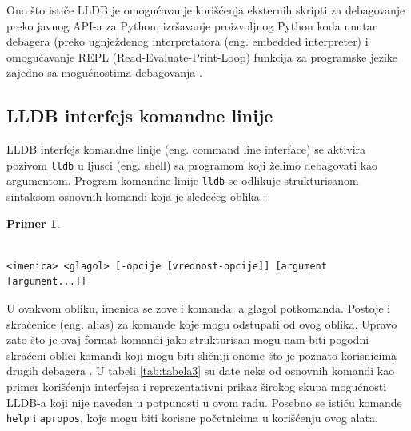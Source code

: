 \documentclass[a4paper]{article}
\newtheorem{primer}{Primer}[section]
\begin{document}
Ono što ističe LLDB je omogućavanje korišćenja eksternih skripti za debagovanje
preko javnog API-a za Python, izršavanje proizvoljnog Python koda unutar
debagera \cite{lldb_python} (preko ugnježdenog interpretatora (eng. embedded
interpreter) i omogućavanje REPL (Read-Evaluate-Print-Loop) funkcija za
programske jezike zajedno sa mogućnostima debagovanja \cite{swift_lldb_repl}.

\subsection{LLDB interfejs komandne linije}
LLDB interfejs komandne linije (eng. command line interface) se aktivira pozivom
\verb|lldb| u ljusci (eng. shell) sa programom koji želimo debagovati kao
argumentom. Program komandne linije \verb|lldb| se odlikuje strukturisanom sintaksom
osnovnih komandi koja je sledećeg oblika \cite{lldb_tutorial}:
\begin{primer}
  \begin{footnotesize}
\begin{verbatim}

<imenica> <glagol> [-opcije [vrednost-opcije]] [argument [argument...]]
\end{verbatim}
  \end{footnotesize}
\end{primer}
U ovakvom obliku, imenica se zove i komanda, a glagol potkomanda. Postoje i
skraćenice (eng. alias) za komande koje mogu odstupati od ovog oblika. Upravo
zato što je ovaj format komandi jako strukturisan mogu nam biti pogodni skraćeni
oblici komandi koji mogu biti sličniji onome što je poznato korisnicima drugih
debagera \cite{apple_lldb_comms}. U tabeli \ref{tab:tabela3} su date neke od
osnovnih komandi kao primer korišćenja interfejsa i reprezentativni prikaz
širokog skupa mogućnosti LLDB-a koji nije naveden u potpunosti u ovom
radu. Posebno se ističu komande \verb|help| i \verb|apropos|, koje mogu biti
korisne početnicima u korišćenju ovog alata.
\end{document}
